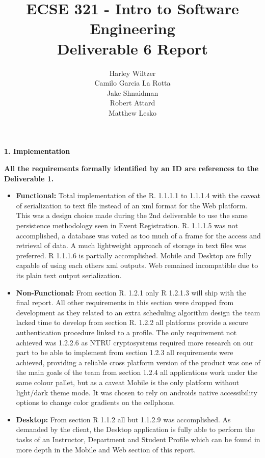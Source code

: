 \documentclass[12pt]{article}
\title{ECSE 321 - Intro to Software Engineering\\Deliverable 6 Report}
\author{Harley Wiltzer\\Camilo Garcia La Rotta\\Jake Shnaidman\\Robert Attard\\Matthew Lesko}
\date
\begin{document}
\maketitle
\newpage
{} %

\newpage
\textbf{1. Implementation}


\textbf{All the requirements formally identified by an ID are references to the Deliverable 1.}
\begin{itemize}

    \item \textbf{Functional:} Total implementation of the R. 1.1.1.1 to 1.1.1.4 with the caveat of serialization to text file instead of an xml format for the Web platform. This was a design choice made during the 2nd deliverable to use the same persistence methodology seen in Event Registration. R. 1.1.1.5 was not accomplished, a database was voted as too much of a frame for the access and retrieval of data. A much lightweight approach of storage in text files was preferred. R 1.1.1.6 is partially accomplished. Mobile and Desktop are fully capable of using each others xml outputs. Web remained incompatible due to its plain text output serialization.
        
    \item \textbf{Non-Functional:} From section R. 1.2.1 only R 1.2.1.3 will ship with the final report. All other requirements in this section were dropped from development as they related to an extra scheduling algorithm design the team lacked time to develop
    from section R. 1.2.2 all platforms provide a secure authentication procedure linked to a profile. The only requirement not achieved was 1.2.2.6 as NTRU cryptosystems required more research on our part to be able to implement from section 1.2.3 all requirements were achieved, providing a reliable cross platform version of the product was one of the main goals of the team from section 1.2.4 all applications work under the same colour pallet, but as a caveat Mobile is the only platform without light/dark theme mode. It was chosen to rely on androids native accessibility options to change color gradients on the cellphone.
        

	\item \textbf{Desktop:} From section R 1.1.2 all but 1.1.2.9 was accomplished. As demanded by the client, the Desktop application is fully able to perform the tasks of an Instructor, Department and Student Profile which can be found in more depth in the Mobile and Web section of this report.
	

\end{itemize}
\end{document}
